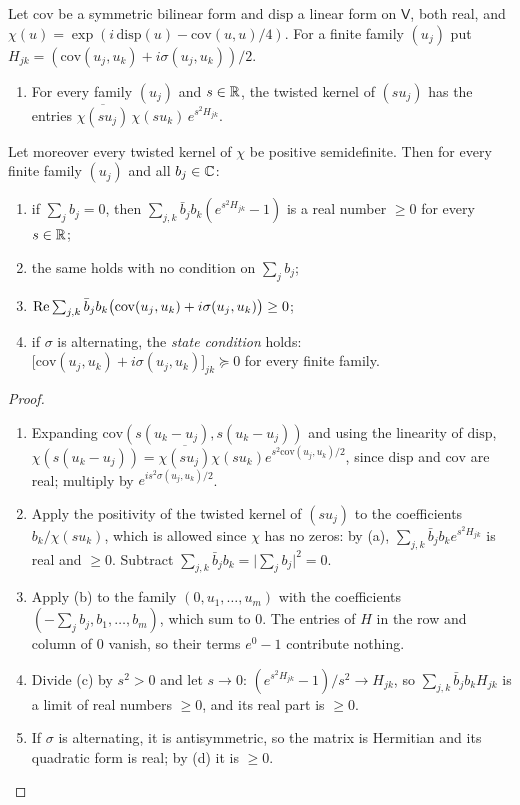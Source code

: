 \begin{veteenv}
\begin{lemma}\label{lem:pg-statecond}
Let $\mathrm{cov}$ be a symmetric bilinear form and $\mathrm{disp}$ a linear form on $\mathsf V$, both real, and
$\chi(u)=\exp(i\,\mathrm{disp}(u)-\mathrm{cov}(u,u)/4)$. For a finite family $(u_j)$ put $H_{jk}=(\mathrm{cov}(u_j,u_k)+i\sigma(u_j,u_k))/2$.
\begin{enumerate}
\item[(a)] For every family $(u_j)$ and $s\in\mathbb R$, the twisted kernel of $(su_j)$ has the entries
$\overline{\chi(su_j)}\,\chi(su_k)\,e^{s^2H_{jk}}$.
\end{enumerate}
Let moreover every twisted kernel of $\chi$ be positive semidefinite. Then for every finite family $(u_j)$ and all $b_j\in\mathbb C$:
\begin{enumerate}
\item[(b)] if $\sum_jb_j=0$, then $\sum_{j,k}\bar b_jb_k(e^{s^2H_{jk}}-1)$ is a real number $\ge0$ for every $s\in\mathbb R$;
\item[(c)] the same holds with no condition on $\sum_jb_j$;
\item[(d)] $\operatorname{Re}\sum_{j,k}\bar b_jb_k\bigl(\mathrm{cov}(u_j,u_k)+i\sigma(u_j,u_k)\bigr)\ge0$;
\item[(e)] if $\sigma$ is alternating, the \emph{state condition} holds: $\bigl[\mathrm{cov}(u_j,u_k)+i\sigma(u_j,u_k)\bigr]_{jk}\succeq0$ for every
finite family.
\end{enumerate}
\end{lemma}

\begin{proof}
\begin{enumerate}
\item[(a)] Expanding $\mathrm{cov}(s(u_k-u_j),s(u_k-u_j))$ and using the linearity of $\mathrm{disp}$,
$\chi(s(u_k-u_j))=\overline{\chi(su_j)}\chi(su_k)e^{s^2\mathrm{cov}(u_j,u_k)/2}$, since $\mathrm{disp}$ and $\mathrm{cov}$ are real; multiply by
$e^{is^2\sigma(u_j,u_k)/2}$.
\item[(b)] Apply the positivity of the twisted kernel of $(su_j)$ to the coefficients $b_k/\chi(su_k)$, which is allowed since $\chi$ has no
zeros: by (a), $\sum_{j,k}\bar b_jb_ke^{s^2H_{jk}}$ is real and $\ge0$. Subtract $\sum_{j,k}\bar b_jb_k=\lvert\sum_jb_j\rvert^2=0$.
\item[(c)] Apply (b) to the family $(0,u_1,\ldots,u_m)$ with the coefficients $(-\sum_jb_j,b_1,\ldots,b_m)$, which sum to $0$. The entries of $H$ in
the row and column of $0$ vanish, so their terms $e^0-1$ contribute nothing.
\item[(d)] Divide (c) by $s^2>0$ and let $s\to0$: $(e^{s^2H_{jk}}-1)/s^2\to H_{jk}$, so $\sum_{j,k}\bar b_jb_kH_{jk}$ is a limit of real numbers
$\ge0$, and its real part is $\ge0$.
\item[(e)] If $\sigma$ is alternating, it is antisymmetric, so the matrix is Hermitian and its quadratic form is real; by (d) it is
$\ge0$.\qedhere
\end{enumerate}
\end{proof}


\end{veteenv}
